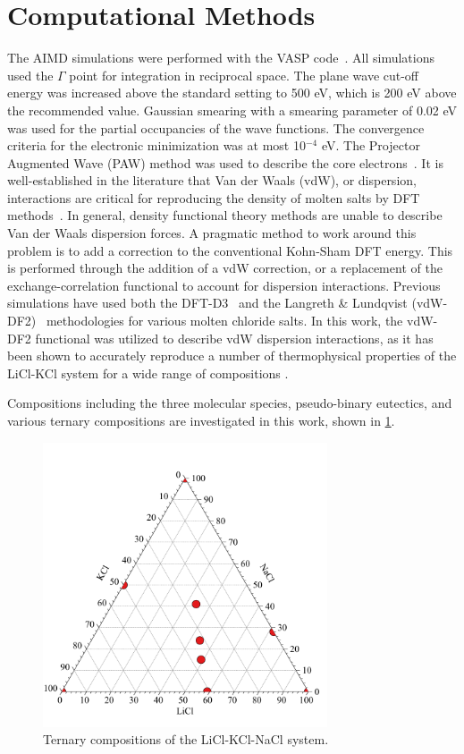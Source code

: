 \documentclass[review]{elsarticle}
\begin{document}
\section{Computational Methods}\label{sec:method}
The AIMD simulations were performed with the VASP code~\cite{Kresse1996}. All simulations used the $\Gamma$ point for integration in reciprocal space. The plane wave cut-off energy was increased above the standard setting to 500 eV, which is 200 eV above the recommended value. Gaussian smearing with a smearing parameter of 0.02 eV was used for the partial occupancies of the wave functions. The convergence criteria for the electronic minimization was at most 10$^{-4}$ eV. The Projector Augmented Wave (PAW) method was used to describe the core electrons~\cite{PAW1,PAW2}. It is well-established in the literature that Van der Waals (vdW), or dispersion, interactions are critical for reproducing the density of molten salts by DFT methods~\cite{Li,Nam2014,Nam2015}. In general, density functional theory methods are unable to describe Van der Waals dispersion forces. A pragmatic method to work around this problem is to add a correction to the conventional Kohn-Sham DFT energy. This is performed through the addition of a vdW correction, or a replacement of the exchange-correlation functional to account for dispersion interactions. Previous simulations have used both the DFT-D3~\cite{Li,Grimme} and the Langreth \& Lundqvist (vdW-DF2)~\cite{Nam2015,Dion,Klimes} methodologies for various molten chloride salts. In this work, the vdW-DF2 functional was utilized to describe vdW dispersion interactions, as it has been shown to accurately reproduce a number of thermophysical properties of the LiCl-KCl system for a wide range of compositions \cite{Duemmler2021}. 

Compositions including the three molecular species, pseudo-binary eutectics, and various ternary compositions are investigated in this work, shown in \cref{fig:ternary}.

\begin{figure}[htbp]
\begin{center}
\includegraphics[width=0.75\textwidth]{ternary.pdf}
\caption{Ternary compositions of the LiCl-KCl-NaCl system.}
\label{fig:ternary}
\end{center}
\end{figure}
\end{document}
